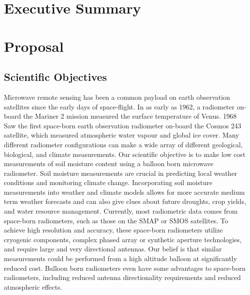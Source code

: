 \documentclass[12pt]{article}
\begin{document}
\listoftables
\newpage

\sectionfont{\scshape}


\section{Executive Summary}
\newpage

\section{Proposal}
\subsection{Scientific Objectives}

Microwave remote sensing has been a common payload on earth observation satellites since the early days of space-flight. In as early as 1962, a radiometer on-board the Mariner 2 mission measured the surface temperature of Venus. 1968 Saw the first space-born earth observation radiometer on-board the  Cosmos 243 satellite, which measured atmospheric water vapour and global ice cover. Many different radiometer configurations can make a wide array of different geological, biological, and climate measurements. Our scientific objective is to make low cost measurements of soil moisture content using a balloon born microwave radiometer. Soil moisture measurements are crucial in predicting local weather conditions and monitoring climate change. Incorporating soil moisture measurements into weather and climate models allows for more accurate medium term weather forecasts and can also give clues about future droughts, crop yields, and water resource management. Currently, most radiometric data comes from space-born radiometers, such as those on the SMAP or SMOS satellites. To achieve high resolution and accuracy, these space-born radiometers utilize cryogenic components, complex phased array or synthetic aperture technologies, and require large and very directional antennas. Our belief is that similar measurements could be performed from a high altitude balloon at significantly reduced cost. Balloon born radiometers even have some advantages to space-born radiometers, including reduced antenna directionality requirements and reduced atmospheric effects. 
 
\end{document}
